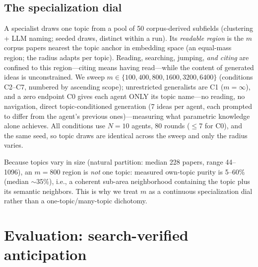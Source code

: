\documentclass{article} %
\begin{document}
\subsection{The specialization dial}
\label{sec:scopes}

A specialist draws one topic from a pool of 50 corpus-derived subfields
(clustering + LLM naming; seeded draws, distinct within a run). Its
\emph{readable region} is the $m$ corpus papers nearest the topic anchor
in embedding space (an equal-mass region; the radius adapts per topic).
Reading, searching, jumping, \emph{and citing} are confined to this
region---citing means having read---while the content of generated ideas
is unconstrained. We sweep $m \in \{100, 400, 800, 1600, 3200, 6400\}$
(conditions C2--C7, numbered by ascending scope); unrestricted
generalists are C1 ($m=\infty$), and a zero endpoint C0 gives each
agent ONLY its topic name---no reading, no navigation, direct
topic-conditioned generation (7 ideas per agent, each prompted to
differ from the agent's previous ones)---measuring what parametric
knowledge alone achieves. All
conditions use $N{=}10$ agents, 80 rounds ($\leq$7 for C0), and the
same seed, so topic draws are identical across the sweep and only the
radius varies.

Because topics vary in size (natural partition: median 228 papers, range
44--1096), an $m=800$ region is \emph{not} one topic: measured own-topic
purity is 5--60\% (median $\sim$35\%), i.e., a coherent sub-area
neighborhood containing the topic plus its semantic neighbors. This is
why we treat $m$ as a continuous specialization dial rather than a
one-topic/many-topic dichotomy.

\section{Evaluation: search-verified anticipation}
\label{sec:eval}
\end{document}
